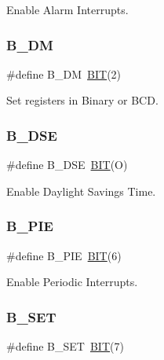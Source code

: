 Enable Alarm Interrupts. 

\hypertarget{group___serial_gaf35235826316c655d2ef79122d85ee89}{}\label{group___serial_gaf35235826316c655d2ef79122d85ee89} 
\subsubsection{\texorpdfstring{B\+\_\+\+DM}{B\_DM}}
{\footnotesize\ttfamily \#define B\+\_\+\+DM~\hyperlink{group___serial_ga3a8ea58898cb58fc96013383d39f482c}{B\+IT}(2)}



Set registers in Binary or B\+CD. 

\hypertarget{group___serial_ga68191f0d4776566585fbb339c785f8d5}{}\label{group___serial_ga68191f0d4776566585fbb339c785f8d5} 
\subsubsection{\texorpdfstring{B\+\_\+\+D\+SE}{B\_DSE}}
{\footnotesize\ttfamily \#define B\+\_\+\+D\+SE~\hyperlink{group___serial_ga3a8ea58898cb58fc96013383d39f482c}{B\+IT}(O)}



Enable Daylight Savings Time. 

\hypertarget{group___serial_gac7311a388e3219a525b432d63688f4e4}{}\label{group___serial_gac7311a388e3219a525b432d63688f4e4} 
\subsubsection{\texorpdfstring{B\+\_\+\+P\+IE}{B\_PIE}}
{\footnotesize\ttfamily \#define B\+\_\+\+P\+IE~\hyperlink{group___serial_ga3a8ea58898cb58fc96013383d39f482c}{B\+IT}(6)}



Enable Periodic Interrupts. 

\hypertarget{group___serial_gab89ee9b74d48a06f138aa6b593a6a7f6}{}\label{group___serial_gab89ee9b74d48a06f138aa6b593a6a7f6} 
\subsubsection{\texorpdfstring{B\+\_\+\+S\+ET}{B\_SET}}
{\footnotesize\ttfamily \#define B\+\_\+\+S\+ET~\hyperlink{group___serial_ga3a8ea58898cb58fc96013383d39f482c}{B\+IT}(7)}



